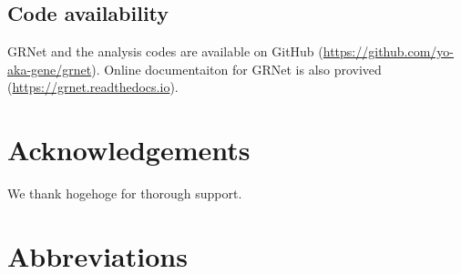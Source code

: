 \documentclass{article}
\begin{document}
\subsection*{Code availability}
GRNet and the analysis codes are available on GitHub (\url{https://github.com/yo-aka-gene/grnet}).
Online documentaiton for GRNet is also provived (\url{https://grnet.readthedocs.io}).



\section*{Acknowledgements}
We thank hogehoge for thorough support.


\section*{Abbreviations}
\printacronyms[heading=Abbreviations]



\end{document}
